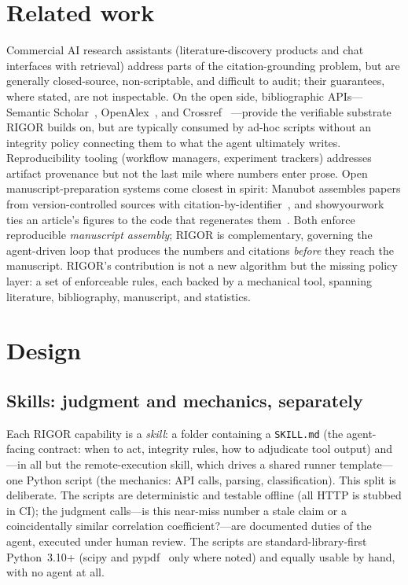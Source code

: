 \documentclass[11pt]{article}
\begin{document}
\section{Related work}

Commercial AI research assistants (literature-discovery products and chat
interfaces with retrieval) address parts of the citation-grounding problem,
but are generally closed-source, non-scriptable, and difficult to audit; their
guarantees, where stated, are not inspectable. On the open side,
bibliographic APIs---Semantic Scholar~\cite{kinney2023semanticscholar},
OpenAlex~\cite{priem2022openalex}, and Crossref~\cite{hendricks2020crossref}%
---provide the verifiable substrate RIGOR builds on, but are typically consumed
by ad-hoc scripts without an integrity policy connecting them to what the
agent ultimately writes. Reproducibility tooling (workflow managers,
experiment trackers) addresses artifact provenance but not the last mile where
numbers enter prose. Open manuscript-preparation systems come closest in
spirit: Manubot assembles papers from version-controlled sources with
citation-by-identifier~\cite{himmelstein2019manubot}, and showyourwork ties an
article's figures to the code that regenerates
them~\cite{showyourwork}. Both enforce reproducible \emph{manuscript assembly};
RIGOR is complementary, governing the agent-driven loop that produces the
numbers and citations \emph{before} they reach the manuscript. RIGOR's
contribution is not a new algorithm but the missing policy layer: a set of
enforceable rules, each backed by a mechanical tool, spanning literature,
bibliography, manuscript, and statistics.

\section{Design}

\subsection{Skills: judgment and mechanics, separately}

Each RIGOR capability is a \emph{skill}: a folder containing a
\texttt{SKILL.md} (the agent-facing contract: when to act, integrity rules,
how to adjudicate tool output) and---in all but the remote-execution skill,
which drives a shared runner template---one Python script (the mechanics:
API calls, parsing, classification). This split is deliberate. The scripts are
deterministic and testable offline (all HTTP is stubbed in CI); the judgment
calls---is this near-miss number a stale claim or a coincidentally similar
correlation coefficient?---are documented duties of the agent, executed under
human review. The scripts are standard-library-first Python~3.10+ (scipy and
pypdf~\cite{pypdf} only where noted) and equally usable by hand, with no agent
at all.
\end{document}
